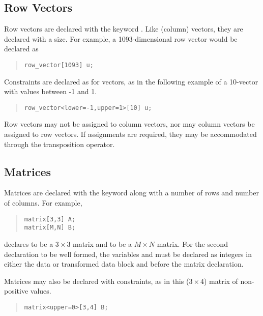 \subsection{Row Vectors}

Row vectors are declared with the keyword .
Like (column) vectors, they are declared with a size.  For example,
a 1093-dimensional row vector  would be declared as
%
\begin{quote}
\begin{Verbatim}
row_vector[1093] u;
\end{Verbatim}
\end{quote}
%
Constraints are declared as for vectors, as in the following example
of a 10-vector with values between -1 and 1.
\begin{quote}
\begin{Verbatim}
row_vector<lower=-1,upper=1>[10] u;
\end{Verbatim}
\end{quote}
%

Row vectors may not be assigned to column vectors, nor may column
vectors be assigned to row vectors.  If assignments are required, they
may be accommodated through the transposition operator.

\subsection{Matrices}

Matrices are declared with the keyword  along with a
number of rows and number of columns.  For example, 
%
\begin{quote}
\begin{Verbatim}  
matrix[3,3] A;  
matrix[M,N] B;
\end{Verbatim}
\end{quote}
%  
declares  to be a $3 \times 3$ matrix and  to be a $M
\times N$ matrix.  For the second declaration to be well formed, the
variables  and  must be declared as integers in either
the data or transformed data block and before the matrix declaration.

Matrices may also be declared with constraints, as in this ($3 \times $4)
matrix of non-positive values.
%
\begin{quote}
\begin{Verbatim}  
matrix<upper=0>[3,4] B;
\end{Verbatim}
\end{quote}
%  

